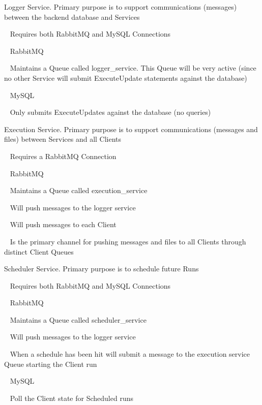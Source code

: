 \begin{DoxyItemize}
\item Logger Service. Primary purpose is to support communications (messages) between the backend database and Services
\item ~ Requires both Rabbit\+MQ and My\+SQL Connections
\item ~ Rabbit\+MQ
\item ~ Maintains a Queue called logger\+\_\+service. This Queue will be very active (since no other Service will submit Execute\+Update statements against the database) ~\newline

\item ~ My\+SQL
\item ~ Only submits Execute\+Updates against the database (no queries)
\item Execution Service. Primary purpose is to support communications (messages and files) between Services and all Clients
\item ~ Requires a Rabbit\+MQ Connection
\item ~ Rabbit\+MQ
\item ~ Maintains a Queue called execution\+\_\+service
\item ~ Will push messages to the logger service
\item ~ Will push messages to each Client
\item ~ Is the primary channel for pushing messages and files to all Clients through distinct Client Queues
\item Scheduler Service. Primary purpose is to schedule future Runs
\item ~ Requires both Rabbit\+MQ and My\+SQL Connections
\item ~ Rabbit\+MQ
\item ~ Maintains a Queue called scheduler\+\_\+service
\item ~ Will push messages to the logger service
\item ~ When a schedule has been hit will submit a message to the execution service Queue starting the Client run
\item ~ My\+SQL
\item ~ Poll the Client state for Scheduled runs ~\newline


\end{DoxyItemize}

